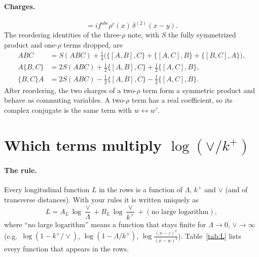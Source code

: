 \documentclass[10pt]{article}
\numberwithin{equation}{section}
\begin{document}
\paragraph{Charges.}
\begin{equation}
[\rho^a(x),\rho^b(y)]=if^{abc}\rho^c(x)\,\delta^{(2)}(x-y).
\label{eq:comm}
\end{equation}
The reordering identities of the three-$\rho$ note, with $S$ the fully symmetrized product and one-$\rho$ terms dropped, are
\begin{align}
ABC&=S(ABC)+\tfrac14\Big(\big\{[A,B],C\big\}+\big\{[A,C],B\big\}+\big\{[B,C],A\big\}\Big),\label{eq:plain}\\
A\{B,C\}&=2S(ABC)+\tfrac12\big\{[A,B],C\big\}+\tfrac12\big\{[A,C],B\big\},\label{eq:Aanti}\\
\{B,C\}A&=2S(ABC)-\tfrac12\big\{[A,B],C\big\}-\tfrac12\big\{[A,C],B\big\}.\label{eq:antiA}
\end{align}
After reordering, the two charges of a two-$\rho$ term form a symmetric product and behave as commuting variables. A two-$\rho$ term has a real coefficient, so its complex conjugate is the same term with $w\leftrightarrow w'$.

\section{Which terms multiply \texorpdfstring{$\log(\vee/k^+)$}{log(vee/k+)}}\label{sec:which}
\paragraph{The rule.} Every longitudinal function $L$ in the rows is a function of $\Lambda$, $k^+$ and $\vee$ (and of transverse distances). With your rules it is written uniquely as
\begin{equation}
L=A_L\,\log\frac{\vee}{\Lambda}+B_L\,\log\frac{\vee}{k^+}+(\text{no large logarithm}),
\label{eq:AB}
\end{equation}
where ``no large logarithm'' means a function that stays finite for $\Lambda\to0$, $\vee\to\infty$ (e.g.\ $\log(1-k^+/\vee)$, $\log(1-\Lambda/k^+)$, $\log\frac{(x-z)^2}{(x-w)^2}$). Table~\ref{tab:L} lists every function that appears in the rows.
\end{document}

